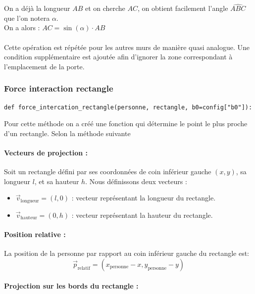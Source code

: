 \documentclass[a4paper,12pt]{article}
\begin{document}
On a déjà la longueur \( AB \) et on cherche \( AC \), on obtient facilement l'angle \( \widehat{ABC} \) que l'on notera \( \alpha \). \\
On a alors : \( AC = \sin(\alpha) \cdot AB \)
\\
\\
\indent Cette opération est répétée pour les autres murs de manière quasi analogue. Une condition supplémentaire est ajoutée afin d’ignorer la zone correspondant à l’emplacement de la porte.

\subsubsection{Force interaction rectangle}

\begin{verbatim}
def force_intercation_rectangle(personne, rectangle, b0=config["b0"]):
\end{verbatim}

Pour cette méthode on a créé une fonction qui détermine le point le plus proche d'un rectangle. Selon la méthode suivante


\paragraph{Vecteurs de projection :}

Soit un rectangle défini par ses coordonnées de coin inférieur gauche $(x, y)$, sa longueur $l$, et sa hauteur $h$. Nous définissons deux vecteurs :
\begin{itemize}
    \item $\vec{v}_{\text{longueur}} = (l, 0)$ : vecteur représentant la longueur du rectangle.
    \item $\vec{v}_{\text{hauteur}} = (0, h)$ : vecteur représentant la hauteur du rectangle.
\end{itemize}

\paragraph{Position relative :}

La position de la personne par rapport au coin inférieur gauche du rectangle est:
\[
\vec{p}_{\text{relatif}} = (x_{\text{personne}} - x, y_{\text{personne}} - y)
\]

\paragraph{Projection sur les bords du rectangle :}
\end{document}
